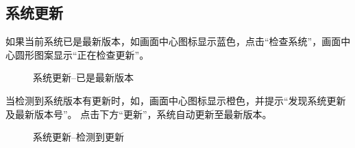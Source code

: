 \subsection{系统更新}
如果当前系统已是最新版本，如画面中心图标显示蓝色，点击“检查系统”，画面中心圆形图案显示“正在检查更新”。

\begin{figure}[ht]
	\centering
	\color{red}{（设计去除左侧绿色标识）}
	\caption{系统更新--已是最新版本}
	\label{fig:已是最新版本}
\end{figure}

当检测到系统版本有更新时，如，画面中心图标显示橙色，并提示“发现系统更新及最新版本号”。 点击下方“更新”，系统自动更新至最新版本。

\begin{figure}[ht]
	\centering
	\color{red}{（设计去除左侧绿色标识）}
	\caption{系统更新--检测到更新}
	\label{fig:检测到更新}
\end{figure}
